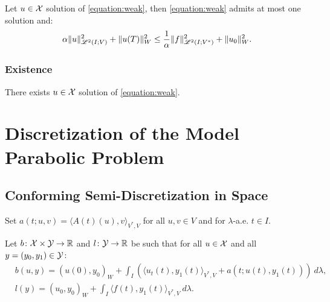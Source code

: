 \begin{lemma}
    Let $u \in \mathcal{X}$ solution of \eqref{equation:weak}, then \eqref{equation:weak} admits at most one solution and:
    \begin{gather}
        \alpha \lVert u \rVert_{\mathscr{L}^{2}(I; V)}^2 + \lVert u(T) \rVert_W^2 \leq \frac{1}{\alpha} \lVert f \rVert_{\mathscr{L}^{2}(I; V^*)}^2 + \lVert u_0 \rVert_W^2.
    \end{gather}
\end{lemma}



\subsubsection{Existence}

\begin{lemma}[Existence]
    There exists $u \in \mathcal{X}$ solution of \eqref{equation:weak}.
\end{lemma}


\newpage
\section{Discretization of the Model Parabolic Problem}

\subsection{Conforming Semi-Discretization in Space}

Set $a(t; u, v) = \langle A(t)(u), v \rangle_{V^*, V}$ for all $u, v \in V$ and for $\lambda$-a.e. $t \in I$.

\begin{definition}[$b$ and $l$]
    Let $b \colon \mathcal{X} \times \mathcal{Y} \rightarrow \mathbb{R}$ and $l \colon \mathcal{Y} \rightarrow \mathbb{R}$ be such that for all $u \in \mathcal{X}$ and all $y = (y_0, y_1) \in \mathcal{Y}$:
    \begin{align}
        & b(u, y) = \left( u(0), y_0 \right)_W + \int_I \left( \langle u_t(t), y_1(t) \rangle_{V^*, V} + a(t; u(t), y_1(t)) \right)~ d \lambda, \\
        & l(y) = \left( u_0, y_0 \right)_W + \int_I \langle f(t), y_1(t) \rangle_{V^*, V} ~ d \lambda.
    \end{align}
\end{definition}

